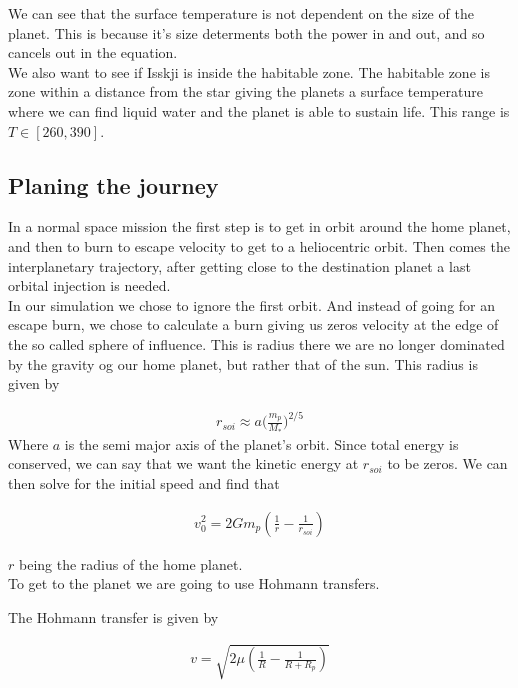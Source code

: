 \documentclass[a4paper, 10pt]{article}
\begin{document}
We can see that the surface temperature is not dependent on the size of the planet. This is because it's size  determents both the power in and out, and so cancels out in the equation.\\

We also want to see if Isskji is inside the habitable zone. The habitable zone is zone within a distance from the star giving the planets a surface temperature where we can find liquid water and the planet is able to sustain life. This range is $T \in [260 , 390]$.

\subsection{Planing the journey}
In a normal space mission the first step is to get in orbit around the home planet, and then to burn to escape velocity to get to a heliocentric orbit. Then comes the interplanetary trajectory, after getting close to the destination planet a last orbital injection is needed.\\

In our simulation we chose to ignore the first orbit. And instead of going for an escape burn, we chose to calculate a burn giving us zeros velocity at the edge of the so called sphere of influence. This is radius there we are no longer dominated by the gravity og our home planet, but rather that of the sun. This radius is given by\cite{sphere}

\begin{align}
r_{soi} \approx a \big( \frac{m_p}{M_*} \big) ^{2/5}
\end{align}
Where $a$ is the semi major axis of the planet's orbit. Since total energy is conserved, we can say that we want the kinetic energy at $r_{soi}$ to be zeros. We can then solve for the initial speed and find that 

\begin{align}
v_{0}^2 = 2Gm_p \left( \frac{1}{r} - \frac{1}{r_{soi}} \right) 
\end{align}

$r$ being the radius of the home planet. \\

To get to the planet we are going to use Hohmann transfers\cite{SpaceDynamics}.

The Hohmann transfer is given by

\begin{align}
v = \sqrt{2\mu \left( \frac{1}{R} - \frac{1}{R + R_p} \right)}
\end{align}
\end{document}
